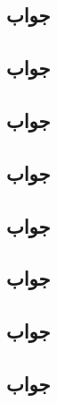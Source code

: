 \documentclass[]{exam}
\begin{document}

\subsection*{جواب}



\subsection*{جواب}



\subsection*{جواب}



\subsection*{جواب}



\subsection*{جواب}


\pagebreak

\subsection*{جواب}



\subsection*{جواب}


\pagebreak

\subsection*{جواب}

\end{document}
